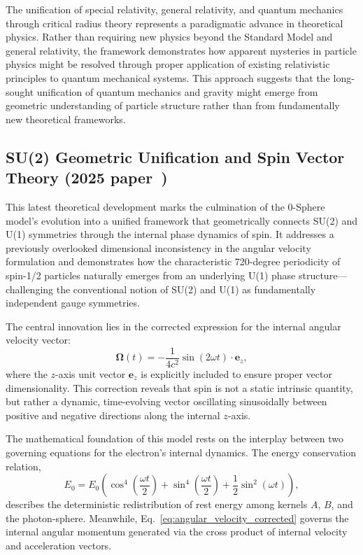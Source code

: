 \documentclass[%
 reprint,
 amsmath,amssymb,
 aps,
]{revtex4-1}
\numberwithin{equation}{section}%
\begin{document}
The unification of special relativity, general relativity, and quantum mechanics through critical radius theory represents a paradigmatic advance in theoretical physics. Rather than requiring new physics beyond the Standard Model and general relativity, the framework demonstrates how apparent mysteries in particle physics might be resolved through proper application of existing relativistic principles to quantum mechanical systems. This approach suggests that the long-sought unification of quantum mechanics and gravity might emerge from geometric understanding of particle structure rather than from fundamentally new theoretical frameworks.

\subsection{SU(2) Geometric Unification and Spin Vector Theory (2025 paper~\cite{hanamura2506.0072})}

This latest theoretical development marks the culmination of the 0-Sphere model’s evolution into a unified framework that geometrically connects SU(2) and U(1) symmetries through the internal phase dynamics of spin. It addresses a previously overlooked dimensional inconsistency in the angular velocity formulation and demonstrates how the characteristic 720-degree periodicity of spin-1/2 particles naturally emerges from an underlying U(1) phase structure—challenging the conventional notion of SU(2) and U(1) as fundamentally independent gauge symmetries.

The central innovation lies in the corrected expression for the internal angular velocity vector:
\begin{equation}
    \boldsymbol{\Omega}(t) = -\frac{1}{4c^2} \sin(2\omega t) \cdot \boldsymbol{e}_z,
\label{eq:angular_velocity_corrected}
\end{equation}
where the $z$-axis unit vector $\boldsymbol{e}_z$ is explicitly included to ensure proper vector dimensionality. This correction reveals that spin is not a static intrinsic quantity, but rather a dynamic, time-evolving vector oscillating sinusoidally between positive and negative directions along the internal $z$-axis.

The mathematical foundation of this model rests on the interplay between two governing equations for the electron’s internal dynamics. The energy conservation relation,
\begin{equation}
E_{0} = E_{0} \left( \cos^{4} \left( \frac{\omega t}{2} \right) + \sin^{4} \left( \frac{\omega t}{2} \right) + \frac{1}{2} \sin^{2} (\omega t) \right),
\label{eq:total_hamiltonian_ref}
\end{equation}
describes the deterministic redistribution of rest energy among kernels $A$, $B$, and the photon-sphere. Meanwhile, Eq.~\eqref{eq:angular_velocity_corrected} governs the internal angular momentum generated via the cross product of internal velocity and acceleration vectors.
\end{document}
